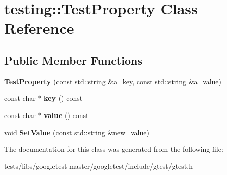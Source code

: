 \hypertarget{classtesting_1_1TestProperty}{}\section{testing\+:\+:Test\+Property Class Reference}
\label{classtesting_1_1TestProperty}
\subsection*{Public Member Functions}
\begin{DoxyCompactItemize}
\item 
\mbox{\label{classtesting_1_1TestProperty_a25a0ccf1c75a92af46a48d3c2a873e6d}} 
{\bfseries Test\+Property} (const std\+::string \&a\+\_\+key, const std\+::string \&a\+\_\+value)
\item 
\mbox{\label{classtesting_1_1TestProperty_ad60435d4ad04ac030487d8998fc61c5f}} 
const char $\ast$ {\bfseries key} () const
\item 
\mbox{\label{classtesting_1_1TestProperty_ad423a07af33c88b0c9ed33ee74815a63}} 
const char $\ast$ {\bfseries value} () const
\item 
\mbox{\label{classtesting_1_1TestProperty_a377245335d9f614cd06d1650e3358e1d}} 
void {\bfseries Set\+Value} (const std\+::string \&new\+\_\+value)
\end{DoxyCompactItemize}


The documentation for this class was generated from the following file\+:\begin{DoxyCompactItemize}
\item 
tests/libs/googletest-\/master/googletest/include/gtest/gtest.\+h\end{DoxyCompactItemize}
